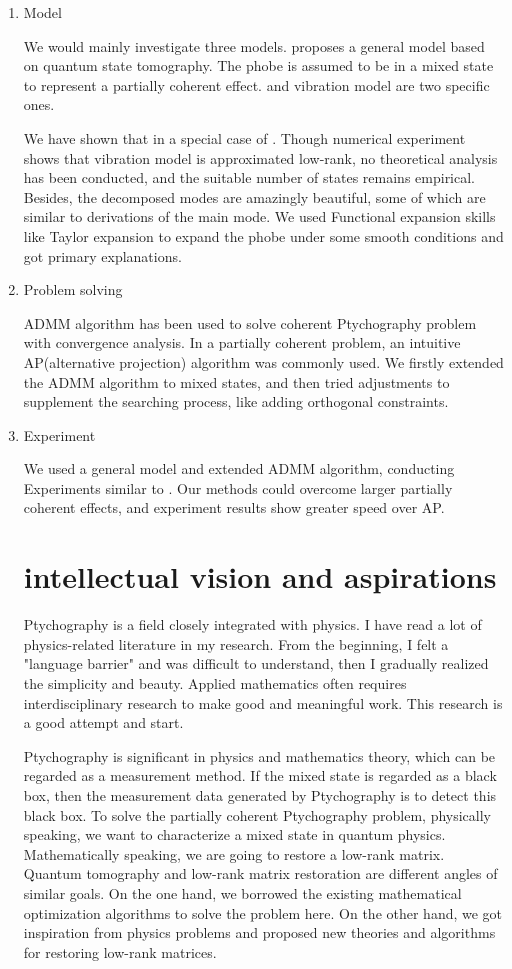 \documentclass{article}
\numberwithin{equation}{section}
\begin{document}
\begin{enumerate}

\item Model 

We would mainly investigate three models. \cite{mix} proposes a general model based on quantum state tomography. The phobe is assumed to be in a mixed state to represent a partially coherent effect. \cite{psf} and vibration model \cite{chang} are two specific ones.

We have shown that \cite{chang} in a special case of \cite{mix}. Though numerical experiment shows that vibration model is approximated low-rank, no theoretical analysis has been conducted, and the suitable number of states remains empirical. Besides, the decomposed modes are amazingly beautiful, some of which are similar to derivations of the main mode. We used Functional expansion skills like Taylor expansion to expand the phobe under some smooth conditions and got primary explanations.  

\item Problem solving

 ADMM algorithm has been used to solve coherent Ptychography problem with convergence analysis\cite{admm}. In a partially coherent problem, an intuitive AP(alternative projection) algorithm was commonly used. We firstly extended the ADMM algorithm to mixed states, and then tried adjustments to supplement the searching process, like adding orthogonal constraints.
 
\item Experiment

 We used a general model and extended ADMM algorithm, conducting Experiments similar to \cite{chang}. Our methods could overcome larger partially coherent effects, and experiment results show greater speed over AP.

\section{intellectual vision and aspirations}
Ptychography is a field closely integrated with physics. I have read a lot of physics-related literature in my research. From the beginning, I felt a "language barrier" and was difficult to understand, then I gradually realized the simplicity and beauty. Applied mathematics often requires interdisciplinary research to make good and meaningful work. This research is a good attempt and start.

Ptychography is significant in physics and mathematics theory, which can be regarded as a measurement method. If the mixed state is regarded as a black box, then the measurement data generated by Ptychography is to detect this black box. To solve the partially coherent Ptychography problem, physically speaking, we want to characterize a mixed state in quantum physics. Mathematically speaking, we are going to restore a low-rank matrix. Quantum tomography and low-rank matrix restoration are different angles of similar goals. On the one hand, we borrowed the existing mathematical optimization algorithms to solve the problem here. On the other hand, we got inspiration from physics problems and proposed new theories and algorithms for restoring low-rank matrices.


\end{enumerate}
\end{document}
